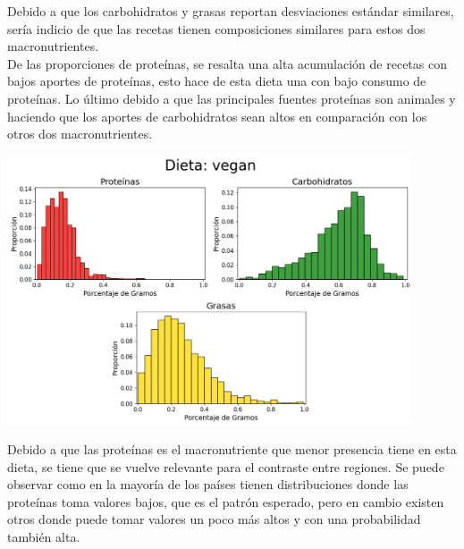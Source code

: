 \documentclass[12pt,a4paper]{article}
\begin{document}
            Debido a que los carbohidratos y grasas reportan desviaciones estándar 
            similares, sería indicio de que las recetas tienen composiciones similares 
            para estos dos macronutrientes.\\

            De las proporciones de proteínas, se resalta una alta acumulación de 
            recetas con bajos aportes de proteínas, esto hace de esta dieta una 
            con bajo consumo de proteínas. Lo último debido a que las principales 
            fuentes proteínas son animales y haciendo que los aportes de carbohidratos 
            sean altos en comparación con los otros dos macronutrientes.

            \begin{center}
                \includegraphics[width=0.90\textwidth]{Resources/2_03_plot_05.png}
            \end{center}

            Debido a que las proteínas es el macronutriente que menor presencia tiene 
            en esta dieta, se tiene que se vuelve relevante para el contraste entre regiones. 
            Se puede observar como en la mayoría de los países tienen distribuciones donde 
            las proteínas toma valores bajos, que es el patrón esperado, pero en cambio 
            existen otros donde puede tomar valores un poco más altos y con una probabilidad 
            también alta.
\end{document}
